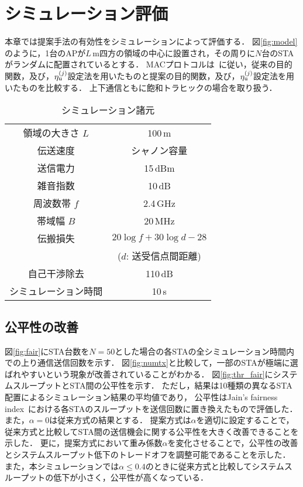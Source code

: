 \documentclass[twocolumn, a4paper]{ieicejsp}
\newcommand{\etau}{\eta_{\rm u}^{(j)}}
\begin{document}
\section{シミュレーション評価}
	本章では提案手法の有効性をシミュレーションによって評価する．
	図\ref{fig:model}のように，1台のAPが$L$\,m四方の領域の中心に設置され，その周りに$N$台のSTAがランダムに配置されているとする．
	MACプロトコルは~\cite{promac}に従い，従来の目的関数，及び，$\etau$設定法を用いたものと提案の目的関数，及び，$\etau$設定法を用いたものを比較する．
	上下通信ともに飽和トラヒックの場合を取り扱う．

	\begin{table}[t]
		\centering
		\caption{シミュレーション諸元}
		\label{tab:param}
		\begin{tabular}{cc} \hline
			領域の大きさ $L$ & 100\,m \\
			伝送速度 & シャノン容量 \\
			送信電力 & 15\,dBm \\
			雑音指数 & 10\,dB \\
			周波数帯 $f$& 2.4\,GHz \\
			帯域幅 $B$ & 20\,MHz \\
			伝搬損失 & $20\log f+30\log d - 28$\\
			&($d$: 送受信点間距離)\\
			自己干渉除去 & 110\,dB \\
			シミュレーション時間 & 10\,s \\\hline
		\end{tabular}
	\end{table}

	\subsection{公平性の改善}
		図\ref{fig:fair}にSTA台数を$N=50$とした場合の各STAの全シミュレーション時間内での上り通信送信回数を示す．
		図\ref{fig:numtx}と比較して，一部のSTAが極端に選ばれやすいという現象が改善されていることがわかる．
		図\ref{fig:thr_fair}にシステムスループットとSTA間の公平性を示す．
		ただし，結果は10種類の異なるSTA配置によるシミュレーション結果の平均値であり，
		公平性はJain's fairness index~\cite{jain}における各STAのスループットを送信回数に置き換えたもので評価した．
		また，$\alpha=0$は従来方式の結果とする．
		提案方式は$\alpha$を適切に設定することで，従来方式と比較してSTA間の送信機会に関する公平性を大きく改善できることを示した．
		更に，提案方式において重み係数$\alpha$を変化させることで，公平性の改善とシステムスループット低下のトレードオフを調整可能であることを示した．
		また，本シミュレーションでは$\alpha\leq0.4$のときに従来方式と比較してシステムスループットの低下が小さく，公平性が高くなっている．
\end{document}
